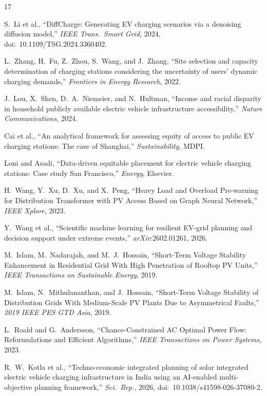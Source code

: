 \documentclass[conference]{IEEEtran}
\begin{document}
\begin{thebibliography}{17}

S.\ Li et al., ``DiffCharge: Generating EV charging scenarios via a denoising diffusion model,'' \textit{IEEE Trans.\ Smart Grid}, 2024, doi:~10.1109/TSG.2024.3360402.

L.\ Zhang, H.\ Fu, Z.\ Zhou, S.\ Wang, and J.\ Zhang, ``Site selection and capacity determination of charging stations considering the uncertainty of users' dynamic charging demands,'' \emph{Frontiers in Energy Research}, 2022.

J.\ Lou, X.\ Shen, D.~A.\ Niemeier, and N.\ Hultman, ``Income and racial disparity in household publicly available electric vehicle infrastructure accessibility,'' \emph{Nature Communications}, 2024.

Cai et al., ``An analytical framework for assessing equity of access to public EV charging stations: The case of Shanghai,'' \textit{Sustainability}, MDPI.

Loni and Asadi, ``Data-driven equitable placement for electric vehicle charging stations: Case study San Francisco,'' \textit{Energy}, Elsevier.

H.\ Wang, Y.\ Xu, D.\ Xu, and X.\ Peng, ``Heavy Load and Overload Pre-warning for Distribution Transformer with PV Access Based on Graph Neural Network,'' \emph{IEEE Xplore}, 2023.

Y.\ Wang et al., ``Scientific machine learning for resilient EV-grid planning and decision support under extreme events,'' \textit{arXiv}:2602.01261, 2026.

M.\ Islam, M.\ Nadarajah, and M.~J.\ Hossain, ``Short-Term Voltage Stability Enhancement in Residential Grid With High Penetration of Rooftop PV Units,'' \emph{IEEE Transactions on Sustainable Energy}, 2019.

M.\ Islam, N.\ Mithulananthan, and J.\ Hossain, ``Short-Term Voltage Stability of Distribution Grids With Medium-Scale PV Plants Due to Asymmetrical Faults,'' \emph{2019 IEEE PES GTD Asia}, 2019.

L.\ Roald and G.\ Andersson, ``Chance-Constrained AC Optimal Power Flow: Reformulations and Efficient Algorithms,'' \emph{IEEE Transactions on Power Systems}, 2023.

R.~W.\ Kotla et al., ``Techno-economic integrated planning of solar integrated electric vehicle charging infrastructure in India using an AI-enabled multi-objective planning framework,'' \textit{Sci.\ Rep.}, 2026, doi:~10.1038/s41598-026-37080-2.


\end{thebibliography}
\end{document}
